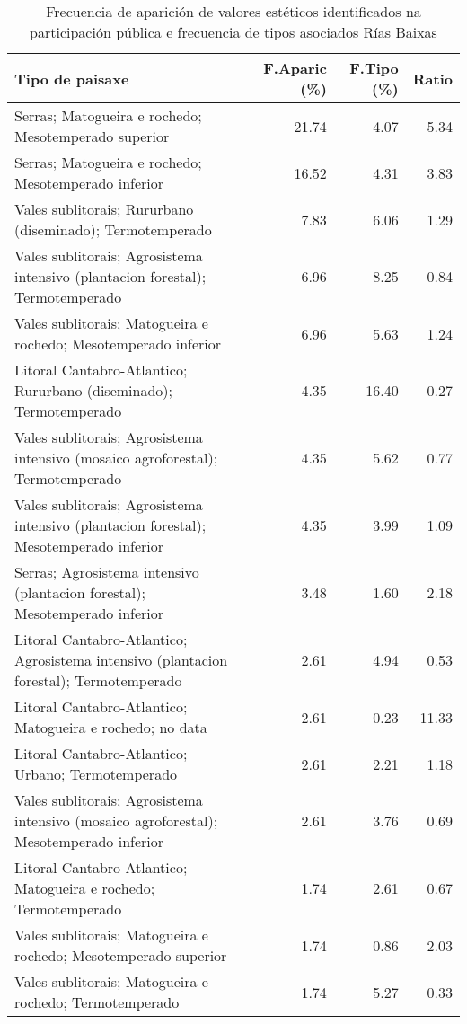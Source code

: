 \begin{table}[p]
\centering
\caption{Frecuencia de aparición de valores estéticos identificados na participación pública e frecuencia de tipos asociados Rías Baixas} 
\label{vsixotest12}
\begin{tabular}{lrrr}
  \hline
Tipo de paisaxe & F.Aparic (\%) & F.Tipo (\%) & Ratio \\ 
  \hline
Serras; Matogueira e rochedo; Mesotemperado superior & 21.74 & 4.07 & 5.34 \\ 
  Serras; Matogueira e rochedo; Mesotemperado inferior & 16.52 & 4.31 & 3.83 \\ 
  Vales sublitorais; Rururbano (diseminado); Termotemperado & 7.83 & 6.06 & 1.29 \\ 
  Vales sublitorais; Agrosistema intensivo (plantacion forestal); Termotemperado & 6.96 & 8.25 & 0.84 \\ 
  Vales sublitorais; Matogueira e rochedo; Mesotemperado inferior & 6.96 & 5.63 & 1.24 \\ 
  Litoral Cantabro-Atlantico; Rururbano (diseminado); Termotemperado & 4.35 & 16.40 & 0.27 \\ 
  Vales sublitorais; Agrosistema intensivo (mosaico agroforestal); Termotemperado & 4.35 & 5.62 & 0.77 \\ 
  Vales sublitorais; Agrosistema intensivo (plantacion forestal); Mesotemperado inferior & 4.35 & 3.99 & 1.09 \\ 
  Serras; Agrosistema intensivo (plantacion forestal); Mesotemperado inferior & 3.48 & 1.60 & 2.18 \\ 
  Litoral Cantabro-Atlantico; Agrosistema intensivo (plantacion forestal); Termotemperado & 2.61 & 4.94 & 0.53 \\ 
  Litoral Cantabro-Atlantico; Matogueira e rochedo; no data & 2.61 & 0.23 & 11.33 \\ 
  Litoral Cantabro-Atlantico; Urbano; Termotemperado & 2.61 & 2.21 & 1.18 \\ 
  Vales sublitorais; Agrosistema intensivo (mosaico agroforestal); Mesotemperado inferior & 2.61 & 3.76 & 0.69 \\ 
  Litoral Cantabro-Atlantico; Matogueira e rochedo; Termotemperado & 1.74 & 2.61 & 0.67 \\ 
  Vales sublitorais; Matogueira e rochedo; Mesotemperado superior & 1.74 & 0.86 & 2.03 \\ 
  Vales sublitorais; Matogueira e rochedo; Termotemperado & 1.74 & 5.27 & 0.33 \\ 
   \hline
\end{tabular}
\end{table}
